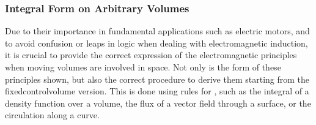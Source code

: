 \documentclass[letterpaper,10pt,english]{jupyterBook}
\begin{document}
\subsubsection{Integral Form on Arbitrary Volumes}
\label{\detokenize{ch/principles-vacuum:integral-form-on-arbitrary-volumes}}\label{\detokenize{ch/principles-vacuum:classical-electromagnetism-principles-integral-arbitrary-volume}}
\sphinxAtStartPar
Due to their importance in fundamental applications such as electric motors, and to avoid confusion or leaps in logic when dealing with electromagnetic induction, it is crucial to provide the correct expression of the electromagnetic principles when moving volumes are involved in space. Not only is the form of these principles shown, but also the correct procedure to derive them starting from the fixed\sphinxhyphen{}control\sphinxhyphen{}volume version. This is done using rules for , such as the integral of a density function over a volume, the flux of a vector field through a surface, or the circulation along a curve.
\end{document}
